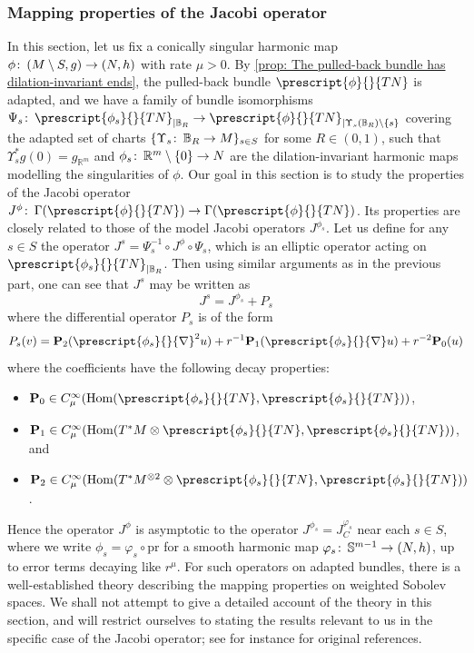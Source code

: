 \documentclass{article}
\numberwithin{equation}{section}        %
\theoremstyle{bfnote}
\theoremstyle{definition}
\theoremstyle{bfremark}
\newcommand{\col}{\colon \thinspace}        %
\newcommand{\R}{\mathbb{R}}                 %
\newcommand{\Ball}{\mathbb{B}}              %
\newcommand{\Sp}{\mathbb{S}}                %
\newcommand{\pr}{\mathrm{pr}}               %
\newcommand{\bmap}[1]{\boldsymbol{\mathrm{#1}}}     %
\DeclareMathOperator{\Hom}{Hom}                 %
\begin{document}
    \subsubsection{Mapping properties of the Jacobi operator}      \label{subsubsec: Mapping properties}

In this section, let us fix a conically singular harmonic map $\phi \col (M \setminus S, g) \to (N,h)$ with rate $\mu > 0$. By \cref{prop: The pulled-back bundle has dilation-invariant ends}, the pulled-back bundle $\prescript{\phi}{}{TN}$ is adapted, and we have a family of bundle isomorphisms $\Psi_s \col \prescript{\phi_s}{}{TN}_{|\Ball_R} \to \prescript{\phi}{}{TN}_{|\Upsilon_s(\Ball_R) \setminus \{s\}}$ covering the adapted set of charts $\{\Upsilon_s \col \Ball_R \to M\}_{s \in S}$ for some $R \in (0,1)$, such that $\Upsilon_s^{*}g(0) = g_{\R^m}$ and $\phi_s \col \R^m \setminus \{0\} \to N$ are the dilation-invariant harmonic maps modelling the singularities of $\phi$. Our goal in this section is to study the properties of the Jacobi operator $J^\phi \col \Gamma(\prescript{\phi}{}{TN}) \to \Gamma(\prescript{\phi}{}{TN})$. Its properties are closely related to those of the model Jacobi operators $J^{\phi_s}$. Let us define for any $s \in S$ the operator $J^s = \Psi^{-1}_s \circ J^\phi \circ \Psi_s$, which is an elliptic operator acting on $\prescript{\phi_s}{}{TN}_{|\Ball_R}$. Then using similar arguments as in the previous part, one can see that $J^s$ may be written as
\begin{equation*}
    J^s = J^{\phi_s} + P_s
\end{equation*}
where the differential operator $P_s$ is of the form
\begin{equation*}
    P_s(v) = \bmap{P}_2(\prescript{\phi_s}{}{\nabla}^2 u) + r^{-1} \bmap{P}_1(\prescript{\phi_s}{}{\nabla} u) + r^{-2} \bmap{P}_0(u)
\end{equation*}
where the coefficients have the following decay properties:
\begin{itemize}
	\item $\bmap{P}_0 \in C^\infty_\mu(\Hom(\prescript{\phi_s}{}{TN},\prescript{\phi_s}{}{TN}))$,
    \item $\bmap{P}_1 \in C^\infty_\mu(\Hom(T^*M \otimes \prescript{\phi_s}{}{TN}, \prescript{\phi_s}{}{TN}))$, and
        \item $\bmap{P}_2 \in C^\infty_\mu(\Hom(T^*M^{\otimes 2} \otimes \prescript{\phi_s}{}{TN}, \prescript{\phi_s}{}{TN}))$.
\end{itemize}
Hence the operator $J^\phi$ is asymptotic to the operator $J^{\phi_s} = J^{\varphi_s}_C$ near each $s \in S$, where we write $\phi_s = \varphi_s \circ \pr$ for a smooth harmonic map $\varphi_s \col \Sp^{m-1} \to (N,h)$, up to error terms decaying like $r^\mu$. For such operators on adapted bundles, there is a well-established theory describing the mapping properties on weighted Sobolev spaces. We shall not attempt to give a detailed account of the theory in this section, and will restrict ourselves to stating the results relevant to us in the specific case of the Jacobi operator; see for instance \cite{Lockhart1985ellipticOperators_on_noncompact_mfds,Melrose1983bCalculus} for original references. 
\end{document}
